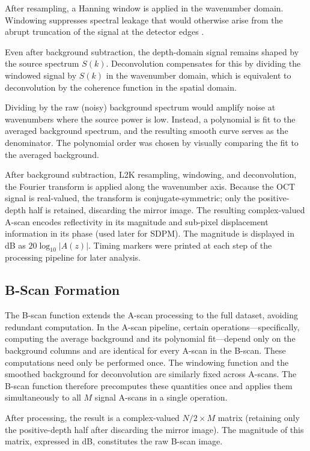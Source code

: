 \documentclass[10pt]{article}
\begin{document}
After resampling, a Hanning window is applied in the wavenumber domain. Windowing suppresses spectral leakage that would otherwise arise from the abrupt truncation of the signal at the detector edges \cite{brianlfrostthesis}.

Even after background subtraction, the depth-domain signal remains shaped by the source spectrum $S(k)$. Deconvolution compensates for this by dividing the windowed signal by $S(k)$ in the wavenumber domain, which is equivalent to deconvolution by the coherence function in the spatial domain.

Dividing by the raw (noisy) background spectrum would amplify noise at wavenumbers where the source power is low. Instead, a polynomial is fit to the averaged background spectrum, and the resulting smooth curve serves as the denominator. The polynomial order was chosen by visually comparing the fit to the averaged background.

After background subtraction, L2K resampling, windowing, and deconvolution, the Fourier transform is applied along the wavenumber axis. Because the OCT signal is real-valued, the transform is conjugate-symmetric; only the positive-depth half is retained, discarding the mirror image. The resulting complex-valued A-scan encodes reflectivity in its magnitude and sub-pixel displacement information in its phase (used later for SDPM). The magnitude is displayed in dB as $20\log_{10}|A(z)|$. Timing markers were printed at each step of the processing pipeline for later analysis.

\subsection{B-Scan Formation}
The B-scan function extends the A-scan processing to the full dataset, avoiding redundant computation. In the A-scan pipeline, certain operations---specifically, computing the average background and its polynomial fit---depend only on the background columns and are identical for every A-scan in the B-scan. These computations need only be performed once. The windowing function and the smoothed background for deconvolution are similarly fixed across A-scans. The B-scan function therefore precomputes these quantities once and applies them simultaneously to all $M$ signal A-scans in a single  operation.

After processing, the result is a complex-valued $N/2 \times M$ matrix (retaining only the positive-depth half after discarding the mirror image). The magnitude of this matrix, expressed in dB, constitutes the raw B-scan image.
\end{document}
